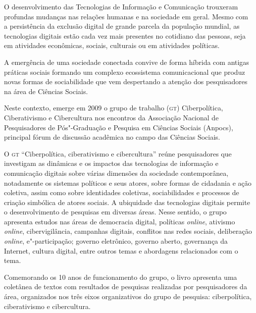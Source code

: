

\noindent{}O desenvolvimento das Tecnologias de Informação e Comunicação trouxeram
profundas mudanças nas relações humanas e na sociedade em geral. Mesmo
com a persistência da exclusão digital de grande parcela da população
mundial, as tecnologias digitais estão cada vez mais presentes no
cotidiano das pessoas, seja em atividades econômicas, sociais, culturais
ou em atividades políticas.

A emergência de uma sociedade conectada convive de forma híbrida com
antigas práticas sociais formando um complexo ecossistema comunicacional
que produz novas formas de sociabilidade que vem despertando a atenção
dos pesquisadores na área de Ciências Sociais.

Neste contexto, emerge em 2009 o grupo de trabalho (\textsc{gt}) Ciberpolítica,
Ciberativismo e Cibercultura nos encontros da Associação Nacional de
Pesquisadores de Pós"-Graduação e Pesquisa em Ciências Sociais (Anpocs),
principal fórum de discussão acadêmica no campo das Ciências Sociais.

O \textsc{gt} ``Ciberpolítica, ciberativismo e cibercultura'' reúne pesquisadores
que investigam as dinâmicas e os impactos das tecnologias de informação
e comunicação digitais sobre várias dimensões da sociedade
contemporânea, notadamente os sistemas políticos e seus atores, sobre
formas de cidadania e ação coletiva, assim como sobre identidades
coletivas, sociabilidades e processos de criação simbólica de atores
sociais. A ubiquidade das tecnologias digitais permite o desenvolvimento
de pesquisas em diversas áreas. Nesse sentido, o grupo apresenta estudos
nas áreas de democracia digital, políticas \emph{online}, ativismo \emph{online},
cibervigilância, campanhas digitais, conflitos nas redes sociais,
deliberação \emph{online}, e"-participação; governo eletrônico, governo aberto,
governança da Internet, cultura digital, entre outros temas e abordagens
relacionados com o tema.

Comemorando os 10 anos de funcionamento do grupo, o livro apresenta uma
coletânea de textos com resultados de pesquisas realizadas por
pesquisadores da área, organizados nos três eixos organizativos do grupo
de pesquisa: ciberpolítica, ciberativismo e cibercultura.

